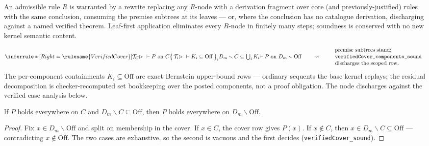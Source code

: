 

\begin{brecipe}\label{rec:vc-template}
An admissible rule $R$ is warranted by a rewrite replacing any
$R$-node with a derivation fragment over core (and
previously-justified) rules with the same conclusion, consuming the
premise subtrees at its leaves --- or, where the conclusion has no
catalogue derivation, discharging against a named verified theorem.
Leaf-first application eliminates every $R$-node in finitely many
steps; soundness is conserved with no new kernel semantic content.
\end{brecipe}

\begin{brecipe}\label{rec:vc-instance}
\[
\inferrule*[Right=\rulename{VerifiedCover}]{
  \mathcal{T}_C \rhd\ \vdash P \ \text{on } C \\
  \bigl\{\, \mathcal{T}_i \rhd\ \vdash K_i \subseteq \mathrm{Off} \,\bigr\}_i \\
  D_m \smallsetminus C \subseteq \textstyle\bigcup_i K_i
}{
  \vdash P \ \text{on } D_m \smallsetminus \mathrm{Off}
}
\qquad\rightsquigarrow\qquad
\begin{array}{l}
\text{\upshape premise subtrees stand;}\\
\text{\texttt{verifiedCover\_components\_sound}}\\
\text{\upshape discharges the scoped row.}
\end{array}
\]
The per-component containments $K_i \subseteq \mathrm{Off}$ are exact
Bernstein upper-bound rows --- ordinary sequents the base kernel
replays; the residual decomposition is checker-recomputed set
bookkeeping over the posted components, not a proof obligation. The
node discharges against the verified case analysis below.
\end{brecipe}

\begin{bprop}\label{prop:vc-sound}
If $P$ holds everywhere on $C$ and
$D_m \smallsetminus C \subseteq \mathrm{Off}$, then $P$ holds
everywhere on $D_m \smallsetminus \mathrm{Off}$.
\end{bprop}
\begin{proof}
Fix $x \in D_m \smallsetminus \mathrm{Off}$ and split on membership in
the cover. If $x \in C$, the cover row gives $P(x)$. If $x \notin C$,
then $x \in D_m \smallsetminus C \subseteq \mathrm{Off}$ ---
contradicting $x \notin \mathrm{Off}$. The two cases are exhaustive,
so the second is vacuous and the first decides
(\texttt{verifiedCover\_sound}).
\end{proof}

